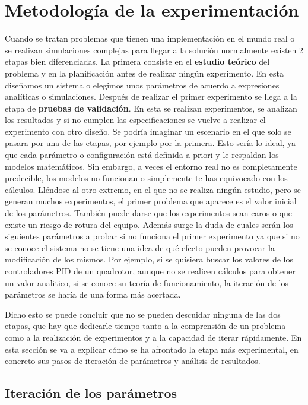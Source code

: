 \section{Metodología de la experimentación} 
Cuando se tratan problemas que tienen una implementación en el mundo real o se realizan simulaciones complejas para llegar a la solución normalmente existen 2 etapas bien diferenciadas. La primera consiste en el \textbf{estudio teórico} del problema y en la planificación antes de realizar ningún experimento. En esta diseñamos un sistema o elegimos unos parámetros de acuerdo a expresiones analíticas o simulaciones. Después de realizar el primer experimento se llega a la etapa de \textbf{pruebas de validación}. En esta se realizan experimentos, se analizan los resultados y si no cumplen las especificaciones se vuelve a realizar el experimento con otro diseño.    
Se podría imaginar un escenario en el que solo se pasara por una de las etapas, por ejemplo por la primera. Esto sería lo ideal, ya que cada parámetro o configuración está definida a priori y le respaldan los modelos matemáticos. Sin embargo, a veces el entorno real no es completamente predecible, los modelos no funcionan o simplemente te has equivocado con los cálculos. 
Lléndose al otro extremo, en el que no se realiza ningún estudio, pero se generan muchos experimentos, el primer problema que aparece es el valor inicial de los parámetros. También  puede darse que los experimentos sean caros o que existe un riesgo de rotura del equipo. Además surge la duda de cuales serán los siguientes parámetros a probar si no funciona el primer experimento ya que si no se conoce el sistema no se tiene una idea de qué efecto pueden provocar la modificación de los mismos. 
Por ejemplo, si se quisiera buscar los valores de los controladores PID de un quadrotor, aunque no se realicen cálculos para obtener un valor analitico, si se conoce su teoría de funcionamiento, la iteración de los parámetros se haría de una forma más acertada.  

Dicho esto se puede concluir que no se pueden descuidar ninguna de las dos etapas, que hay que dedicarle tiempo tanto a la comprensión de un problema como a la realización de experimentos y a la capacidad de iterar rápidamente. En esta sección se va a explicar cómo se ha afrontado la etapa más experimental, en concreto sus pasos de iteración de parámetros y análisis de resultados.


\subsection{Iteración de los parámetros}


